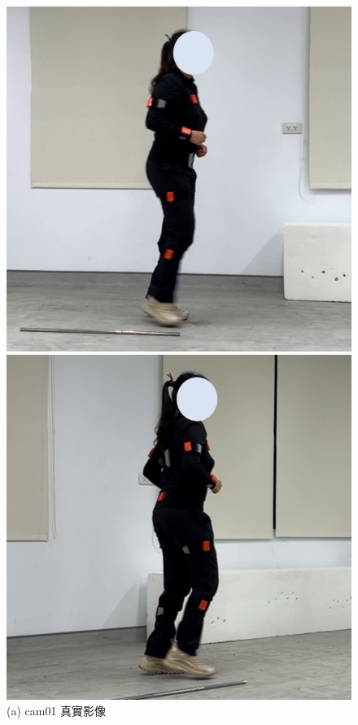 \begin{figure}[!ht]
   \centering
   \begin{minipage}{.5\textwidth}
      \centering
      \includegraphics[width=.95\linewidth]{figure/ch4_fig_run_cam01_with1.jpg}
      \caption*{(a) cam01 真實影像}
    \end{minipage}%
    \begin{minipage}{.5\textwidth}
       \centering
       \includegraphics[width=.95\linewidth]{figure/ch4_fig_run_cam02_with1.jpg}

\end{minipage}
\end{figure}
